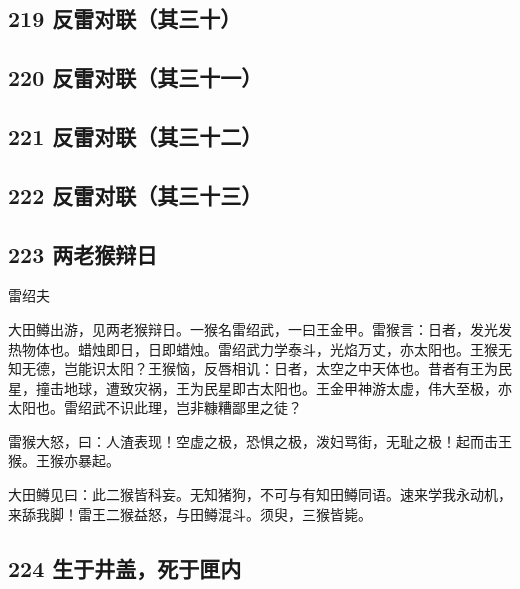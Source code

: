 \hypertarget{ux53cdux96f7ux5bf9ux8054ux5176ux4e09ux5341}{%
\subsection{219
反雷对联（其三十）}\label{ux53cdux96f7ux5bf9ux8054ux5176ux4e09ux5341}}

\hypertarget{ux53cdux96f7ux5bf9ux8054ux5176ux4e09ux5341ux4e00}{%
\subsection{220
反雷对联（其三十一）}\label{ux53cdux96f7ux5bf9ux8054ux5176ux4e09ux5341ux4e00}}

\hypertarget{ux53cdux96f7ux5bf9ux8054ux5176ux4e09ux5341ux4e8c}{%
\subsection{221
反雷对联（其三十二）}\label{ux53cdux96f7ux5bf9ux8054ux5176ux4e09ux5341ux4e8c}}

\hypertarget{ux53cdux96f7ux5bf9ux8054ux5176ux4e09ux5341ux4e09}{%
\subsection{222
反雷对联（其三十三）}\label{ux53cdux96f7ux5bf9ux8054ux5176ux4e09ux5341ux4e09}}

\hypertarget{ux4e24ux8001ux7334ux8fa9ux65e5}{%
\subsection{223 两老猴辩日}\label{ux4e24ux8001ux7334ux8fa9ux65e5}}

{雷绍夫}

大田鳟出游，见两老猴辩日。一猴名雷绍武，一曰王金甲。雷猴言：日者，发光发热物体也。蜡烛即日，日即蜡烛。雷绍武力学泰斗，光焰万丈，亦太阳也。王猴无知无德，岂能识太阳？王猴恼，反唇相讥：日者，太空之中天体也。昔者有王为民星，撞击地球，遭致灾祸，王为民星即古太阳也。王金甲神游太虚，伟大至极，亦太阳也。雷绍武不识此理，岂非糠糟鄙里之徒？

雷猴大怒，曰：人渣表现！空虚之极，恐惧之极，泼妇骂街，无耻之极！起而击王猴。王猴亦暴起。

大田鳟见曰：此二猴皆科妄。无知猪狗，不可与有知田鳟同语。速来学我永动机，来舔我脚！雷王二猴益怒，与田鳟混斗。须臾，三猴皆毙。
~\\

\hypertarget{ux751fux4e8eux4e95ux76d6ux6b7bux4e8eux5323ux5185}{%
\subsection{224
生于井盖，死于匣内}\label{ux751fux4e8eux4e95ux76d6ux6b7bux4e8eux5323ux5185}}

